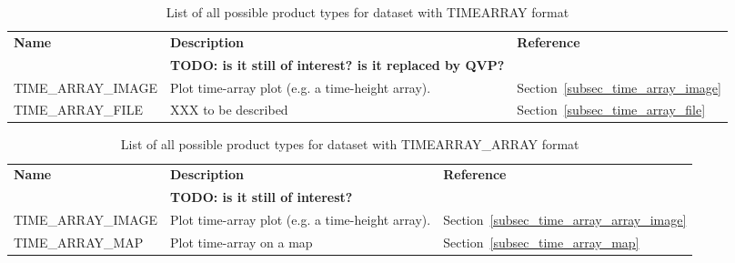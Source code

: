 \documentclass[a4paper,11pt,pdftex,twoside]{scrartcl}
\renewcommand{\bf}{\normalfont \bfseries}
\begin{document}
{{{\begin{table}[H]
\begin{tabularx}{\textwidth}{lXl}
{\bf Name} & {\bf Description} & {\bf Reference}\\
& {\bf TODO: is it still of interest? is it replaced by QVP? } & \\
TIME\_ARRAY\_IMAGE & Plot time-array plot (e.g. a time-height
                     array).                                  & Section~\ref{subsec_time_array_image}\\
TIME\_ARRAY\_FILE & XXX to be described & Section~\ref{subsec_time_array_file}\\
\end{tabularx}
\caption{List of all possible product types for dataset with TIMEARRAY format}
\label{tab_products_TIMEARRAY}
\end{table}


\begin{table}[H]
\begin{tabularx}{\textwidth}{lXl}
{\bf Name} & {\bf Description} & {\bf Reference}\\
& {\bf TODO: is it still of interest? } & \\

TIME\_ARRAY\_IMAGE & Plot time-array plot (e.g. a time-height
                     array).                                  & Section~\ref{subsec_time_array_array_image}\\

TIME\_ARRAY\_MAP   & Plot time-array on a map & Section~\ref{subsec_time_array_map}\\
\end{tabularx}
\caption{List of all possible product types for dataset with TIMEARRAY\_ARRAY format}
\label{tab_products_TIMEARRAY_array}
\end{table}


}}}
\end{document}
